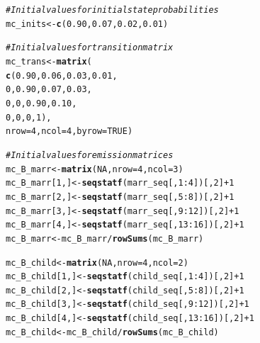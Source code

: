 \documentclass[12pt]{article}\usepackage[]{graphicx}\usepackage[]{color}
\makeatletter
\newcommand{\hlnum}[1]{\textcolor[rgb]{0.686,0.059,0.569}{#1}}%
\newcommand{\hlcom}[1]{\textcolor[rgb]{0.678,0.584,0.686}{\textit{#1}}}%
\newcommand{\hlopt}[1]{\textcolor[rgb]{0,0,0}{#1}}%
\newcommand{\hlstd}[1]{\textcolor[rgb]{0.345,0.345,0.345}{#1}}%
\newcommand{\hlkwb}[1]{\textcolor[rgb]{0.69,0.353,0.396}{#1}}%
\newcommand{\hlkwc}[1]{\textcolor[rgb]{0.333,0.667,0.333}{#1}}%
\newcommand{\hlkwd}[1]{\textcolor[rgb]{0.737,0.353,0.396}{\textbf{#1}}}%
\newenvironment{kframe}{%
 \def\at@end@of@kframe{}%
 \ifinner\ifhmode%
  \def\at@end@of@kframe{\end{minipage}}%
  \begin{minipage}{\columnwidth}%
 \fi\fi%
 \def\FrameCommand##1{\hskip\@totalleftmargin \hskip-\fboxsep
 \colorbox{shadecolor}{##1}\hskip-\fboxsep
     \hskip-\linewidth \hskip-\@totalleftmargin \hskip\columnwidth}%
 \MakeFramed {\advance\hsize-\width
   \@totalleftmargin\z@ \linewidth\hsize
   \@setminipage}}%
 {\par\unskip\endMakeFramed%
 \at@end@of@kframe}
\newenvironment{knitrout}{}{} %
\makeatother
\begin{document}
\begin{knitrout}
\color{fgcolor}\begin{kframe}
\begin{alltt}
\hlcom{# Initial values for initial state probabilities}
\hlstd{mc_inits} \hlkwb{<-} \hlkwd{c}\hlstd{(}\hlnum{0.90}\hlstd{,} \hlnum{0.07}\hlstd{,} \hlnum{0.02}\hlstd{,} \hlnum{0.01}\hlstd{)}

\hlcom{# Initial values for transition matrix}
\hlstd{mc_trans} \hlkwb{<-} \hlkwd{matrix}\hlstd{(}
  \hlkwd{c}\hlstd{(}\hlnum{0.90}\hlstd{,} \hlnum{0.06}\hlstd{,} \hlnum{0.03}\hlstd{,} \hlnum{0.01}\hlstd{,}
       \hlnum{0}\hlstd{,} \hlnum{0.90}\hlstd{,} \hlnum{0.07}\hlstd{,} \hlnum{0.03}\hlstd{,}
       \hlnum{0}\hlstd{,}    \hlnum{0}\hlstd{,} \hlnum{0.90}\hlstd{,} \hlnum{0.10}\hlstd{,}
       \hlnum{0}\hlstd{,}    \hlnum{0}\hlstd{,}    \hlnum{0}\hlstd{,}    \hlnum{1}\hlstd{),}
  \hlkwc{nrow} \hlstd{=} \hlnum{4}\hlstd{,} \hlkwc{ncol} \hlstd{=} \hlnum{4}\hlstd{,} \hlkwc{byrow} \hlstd{=} \hlnum{TRUE}\hlstd{)}

\hlcom{# Initial values for emission matrices}
\hlstd{mc_B_marr} \hlkwb{<-} \hlkwd{matrix}\hlstd{(}\hlnum{NA}\hlstd{,} \hlkwc{nrow} \hlstd{=} \hlnum{4}\hlstd{,} \hlkwc{ncol} \hlstd{=} \hlnum{3}\hlstd{)}
\hlstd{mc_B_marr[}\hlnum{1}\hlstd{,]} \hlkwb{<-} \hlkwd{seqstatf}\hlstd{(marr_seq[,} \hlnum{1}\hlopt{:}\hlnum{4}\hlstd{])[,} \hlnum{2}\hlstd{]} \hlopt{+} \hlnum{1}
\hlstd{mc_B_marr[}\hlnum{2}\hlstd{,]} \hlkwb{<-} \hlkwd{seqstatf}\hlstd{(marr_seq[,} \hlnum{5}\hlopt{:}\hlnum{8}\hlstd{])[,} \hlnum{2}\hlstd{]} \hlopt{+} \hlnum{1}
\hlstd{mc_B_marr[}\hlnum{3}\hlstd{,]} \hlkwb{<-} \hlkwd{seqstatf}\hlstd{(marr_seq[,} \hlnum{9}\hlopt{:}\hlnum{12}\hlstd{])[,} \hlnum{2}\hlstd{]} \hlopt{+} \hlnum{1}
\hlstd{mc_B_marr[}\hlnum{4}\hlstd{,]} \hlkwb{<-} \hlkwd{seqstatf}\hlstd{(marr_seq[,} \hlnum{13}\hlopt{:}\hlnum{16}\hlstd{])[,} \hlnum{2}\hlstd{]} \hlopt{+} \hlnum{1}
\hlstd{mc_B_marr} \hlkwb{<-} \hlstd{mc_B_marr} \hlopt{/} \hlkwd{rowSums}\hlstd{(mc_B_marr)}

\hlstd{mc_B_child} \hlkwb{<-} \hlkwd{matrix}\hlstd{(}\hlnum{NA}\hlstd{,} \hlkwc{nrow} \hlstd{=} \hlnum{4}\hlstd{,} \hlkwc{ncol} \hlstd{=} \hlnum{2}\hlstd{)}
\hlstd{mc_B_child[}\hlnum{1}\hlstd{,]} \hlkwb{<-} \hlkwd{seqstatf}\hlstd{(child_seq[,} \hlnum{1}\hlopt{:}\hlnum{4}\hlstd{])[,} \hlnum{2}\hlstd{]} \hlopt{+} \hlnum{1}
\hlstd{mc_B_child[}\hlnum{2}\hlstd{,]} \hlkwb{<-} \hlkwd{seqstatf}\hlstd{(child_seq[,} \hlnum{5}\hlopt{:}\hlnum{8}\hlstd{])[,} \hlnum{2}\hlstd{]} \hlopt{+} \hlnum{1}
\hlstd{mc_B_child[}\hlnum{3}\hlstd{,]} \hlkwb{<-} \hlkwd{seqstatf}\hlstd{(child_seq[,} \hlnum{9}\hlopt{:}\hlnum{12}\hlstd{])[,} \hlnum{2}\hlstd{]} \hlopt{+} \hlnum{1}
\hlstd{mc_B_child[}\hlnum{4}\hlstd{,]} \hlkwb{<-} \hlkwd{seqstatf}\hlstd{(child_seq[,} \hlnum{13}\hlopt{:}\hlnum{16}\hlstd{])[,} \hlnum{2}\hlstd{]} \hlopt{+} \hlnum{1}
\hlstd{mc_B_child} \hlkwb{<-} \hlstd{mc_B_child} \hlopt{/} \hlkwd{rowSums}\hlstd{(mc_B_child)}


\end{alltt}
\end{kframe}
\end{knitrout}
\end{document}
